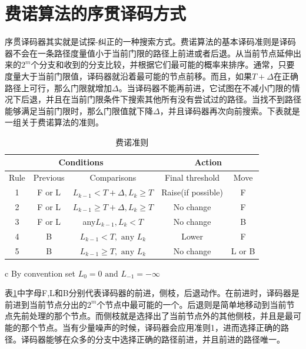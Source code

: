 \documentclass[twoside,numberorder]{buptthesis}
\begin{document}
\section{费诺算法的序贯译码方式}
序贯译码器其实就是试探-纠正的一种搜索方式。费诺算法的基本译码准则是译码器不会在一条路径度量值小于当前门限的路径上前进或者后退。从当前节点延伸出来的$2^m$个分支和收到的分支比较，并根据它们最可能的概率来排序。通常，只要度量大于当前门限值，译码器就沿着最可能的节点前移。而且，如果$T+\Delta$在正确路径上可行，那么门限就增加$\Delta$。当译码器不能再前进，它试图在不减小门限的情况下后退，并且在当前门限条件下搜索其他所有没有尝试过的路径。当找不到路径能够满足当前门限时，那么门限值就下降$\Delta$，并且译码器再次向前搜索。下表就是一组关于费诺算法的准则。
\begin{table}
  \centering
  \caption{费诺准则}
  \label{tab:1}
  \begin{threeparttable}
  \begin{tabular}{ccccc}
    \hline
    \multicolumn{3}{c}{Conditions}&\multicolumn{2}{c}{Action}\\
    \hline
    Rule&Previous&Comparisons\tnote{c}&Final threshold&Move\\
    \hline
    1&F or L&$L_{k-1}<T+\Delta,L_k\ge T$&Raise(if possible)&F\\
    2&F or L&$L_{k-1}\ge T+\Delta,L_k\ge T$&No change&F\\
    3&F or L&any$L_{k-1},L_k<T$&No change&B\\
    4&B&$L_{k-1}<T,\mbox{~any~} L_k$&Lower&F\\
    5&B&$L_{k-1}\ge T,\mbox{~any~} L_k$&No change&L or B\\
    \hline
  \end{tabular}
  \begin{tablenotes}
    \footnotesize
  \item[c] By convention set $L_0=0 \mbox{~and~} L_{-1}=-\infty$
  \end{tablenotes}
\end{threeparttable}
\end{table}
表\ref{tab:1}中字母F,L和B分别代表译码器的前进，侧枝，后退动作。在前进时，译码器是前进到当前节点分出的$2^m$个节点中最可能的一个。后退则是简单地移动到当前节点先前处理的那个节点。而侧枝就是选择出了当前节点外的其他侧枝，并且是最可能的那个节点。当有少量噪声的时候，译码器会应用准则1，进而选择正确的路径。译码器能够在众多的分支中选择正确的路径前进，并且前进的路径唯一。
\end{document}
